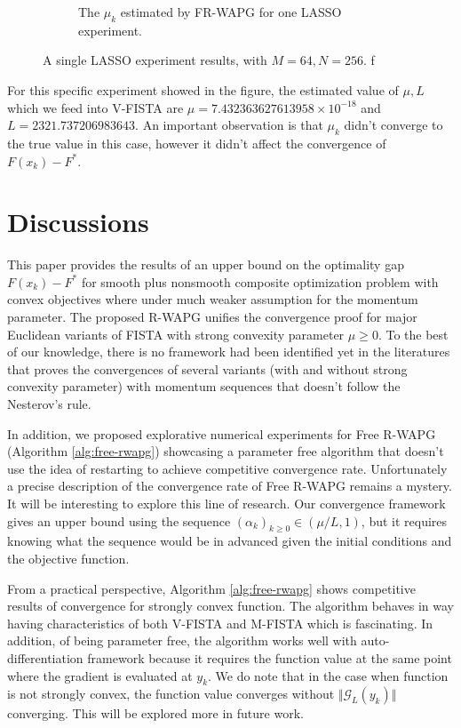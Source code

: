 \documentclass[12pt]{article}
\begin{document}
\begin{figure}[H]
\begin{subfigure}[b]{0.47\textwidth}
                    \caption{The $\mu_k$ estimated by FR-WAPG for one LASSO experiment. }
                \end{subfigure}
                \caption{A single LASSO experiment results, with $M = 64, N=256$. f}
                \label{fig:single-lass-mu-estimates}
            \end{figure}
            For this specific experiment showed in the figure, the estimated value of $\mu, L$ which we feed into V-FISTA are $\mu = 7.432363627613958\times 10^{-18}$ and $L = 2321.737206983643$.
            An important observation is that $\mu_k$ didn't converge to the true value in this case, however it didn't affect the convergence of $F(x_k) - F^*$.

\section{Discussions}
    This paper provides the results of an upper bound on the optimality gap $F(x_k) - F^*$ for smooth plus nonsmooth composite optimization problem with convex objectives where under much weaker assumption for the momentum parameter.
    The proposed R-WAPG unifies the convergence proof for major Euclidean variants of FISTA with strong convexity parameter $\mu \ge 0$.
    To the best of our knowledge, there is no framework had been identified yet in the literatures that proves the convergences of several variants (with and without strong convexity parameter) with momentum sequences that doesn't follow the Nesterov's rule.
    \par
    In addition, we proposed explorative numerical experiments for Free R-WAPG (Algorithm \ref{alg:free-rwapg}) showcasing a parameter free algorithm that doesn't use the idea of restarting to achieve competitive convergence rate.
    Unfortunately a precise description of the convergence rate of Free R-WAPG remains a mystery.
    It will be interesting to explore this line of research.
    Our convergence framework gives an upper bound using the sequence $(\alpha_k)_{k \ge 0} \in (\mu/L, 1)$, but it requires knowing what the sequence would be in advanced given the initial conditions and the objective function.
    \par
    From a practical perspective, Algorithm \ref{alg:free-rwapg} shows competitive results of convergence for strongly convex function.
    The algorithm behaves in way having characteristics of both V-FISTA and M-FISTA which is fascinating.
    In addition, of being parameter free, the algorithm works well with auto-differentiation framework because it requires the function value at the same point where the gradient is evaluated at $y_k$.
    We do note that in the case when function is not strongly convex, the function value converges without $\Vert \mathcal G_L(y_k)\Vert$ converging.
    This will be explored more in future work.







\appendix
\end{document}
